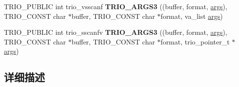\begin{DoxyCompactItemize}
\mbox{\label{group___scanf_ga250821a4c62d51fae40300b07b58755c}} 
T\+R\+I\+O\+\_\+\+P\+U\+B\+L\+IC int trio\+\_\+vsscanf {\bfseries T\+R\+I\+O\+\_\+\+A\+R\+G\+S3} ((buffer, format, \hyperlink{structargs}{args}), T\+R\+I\+O\+\_\+\+C\+O\+N\+ST char $\ast$buffer, T\+R\+I\+O\+\_\+\+C\+O\+N\+ST char $\ast$format, va\+\_\+list \hyperlink{structargs}{args})
\item 
\mbox{\label{group___scanf_gab749adda570c2999c9154f2843b2fe27}} 
T\+R\+I\+O\+\_\+\+P\+U\+B\+L\+IC int trio\+\_\+sscanfv {\bfseries T\+R\+I\+O\+\_\+\+A\+R\+G\+S3} ((buffer, format, \hyperlink{structargs}{args}), T\+R\+I\+O\+\_\+\+C\+O\+N\+ST char $\ast$buffer, T\+R\+I\+O\+\_\+\+C\+O\+N\+ST char $\ast$format, trio\+\_\+pointer\+\_\+t $\ast$\hyperlink{structargs}{args})
\end{DoxyCompactItemize}


\subsection{详细描述}
